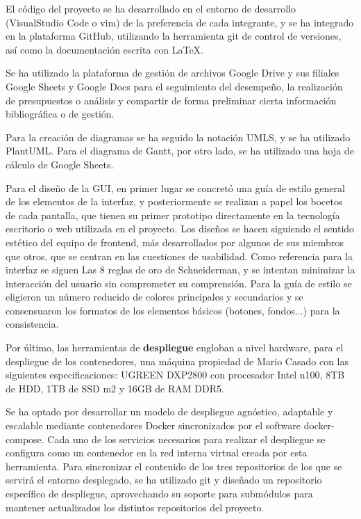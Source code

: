 \documentclass[11pt]{article}
\begin{document}
El código del proyecto se ha desarrollado en el entorno de desarrollo
(VisualStudio Code o vim) de la preferencia de cada integrante, y se ha
integrado en la plataforma GitHub, utilizando
la herramienta git de control de versiones, así como la documentación
escrita con LaTeX. 

Se ha utilizado la plataforma de gestión
de archivos Google Drive y sus filiales Google Sheets y Google Docs para 
el seguimiento del desempeño, la realización de presupuestos o análisis
y compartir de forma preliminar cierta información bibliográfica o de gestión.

Para la creación de diagramas se ha seguido la notación
UMLS, y se ha utilizado PlantUML.
Para el diagrama de Gantt, por otro lado, se ha utilizado una hoja de cálculo de Google Sheets.

Para el diseño de la GUI, en primer lugar se concretó una guía de estilo general
de los elementos de la interfaz, y posteriormente se realizan a papel los
bocetos de cada pantalla, que tienen su primer prototipo directamente en la
tecnología escritorio o web utilizada en el proyecto. Los diseños se hacen
siguiendo el sentido estético del equipo de frontend, más desarrollados por
algunos de sus miembros que otros, que se centran en las cuestiones de 
usabilidad. Como referencia para la interfaz se siguen Las 8 reglas de oro
de Schneiderman, y se intentan minimizar la interacción del usuario sin
comprometer su comprensión. Para la guía de estilo se eligieron un
número reducido de colores principales y secundarios y se consensuaron los
formatos de los elementos básicos (botones, fondos...) para la consistencia.

Por último, las herramientas de \textbf{despliegue} engloban
a nivel hardware, para el despliegue de los contenedores, una máquina 
propiedad de Mario Casado con las siguientes especificaciones: 
UGREEN DXP2800 con procesador Intel n100,
8TB de HDD, 1TB de SSD m2 y 16GB de RAM DDR5.


Se ha optado por desarrollar un modelo de despliegue agnóstico, adaptable y
escalable mediante contenedores Docker sincronizados por el software
docker-compose. Cada uno de los servicios necesarios para realizar el
despliegue se configura como un contenedor en la red interna virtual creada por
esta herramienta. Para sincronizar el contenido de los tres repositorios de los
que se servirá el entorno desplegado, se ha utilizado git y diseñado un
repositorio específico de despliegue, aprovechando su soporte para submódulos
para mantener actualizados los distintos repositorios del proyecto. 
\end{document}
